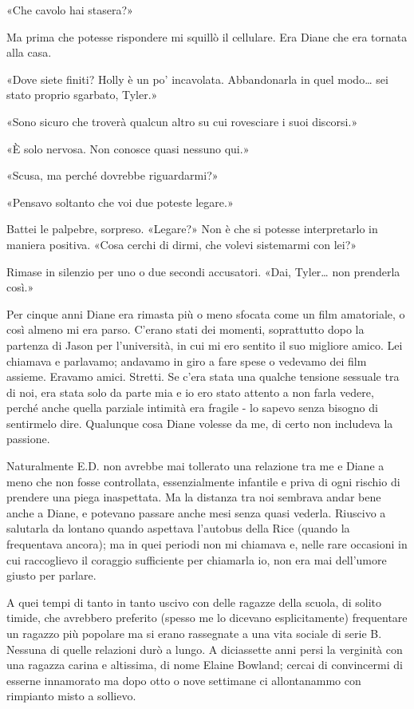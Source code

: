 «Che cavolo hai stasera?»

Ma prima che potesse rispondere mi squillò il cellulare. Era Diane che
era tornata alla casa.

«Dove siete finiti? Holly è un po' incavolata. Abbandonarla in quel
modo\ldots{} sei stato proprio sgarbato, Tyler.»

«Sono sicuro che troverà qualcun altro su cui rovesciare i suoi
discorsi.»

«È solo nervosa. Non conosce quasi nessuno qui.»

«Scusa, ma perché dovrebbe riguardarmi?»

«Pensavo soltanto che voi due poteste legare.»

Battei le palpebre, sorpreso. «Legare?» Non è che si potesse
interpretarlo in maniera positiva. «Cosa cerchi di dirmi, che volevi
sistemarmi con lei?»

Rimase in silenzio per uno o due secondi accusatori. «Dai, Tyler\ldots{}
non prenderla così.»

Per cinque anni Diane era rimasta più o meno sfocata come un film
amatoriale, o così almeno mi era parso. C'erano stati dei momenti,
soprattutto dopo la partenza di Jason per l'università, in cui mi ero
sentito il suo migliore amico. Lei chiamava e parlavamo; andavamo in
giro a fare spese o vedevamo dei film assieme. Eravamo amici. Stretti.
Se c'era stata una qualche tensione sessuale tra di noi, era stata solo
da parte mia e io ero stato attento a non farla vedere, perché anche
quella parziale intimità era fragile - lo sapevo senza bisogno di
sentirmelo dire. Qualunque cosa Diane volesse da me, di certo non
includeva la passione.

Naturalmente E.D. non avrebbe mai tollerato una relazione tra me e Diane
a meno che non fosse controllata, essenzialmente infantile e priva di
ogni rischio di prendere una piega inaspettata. Ma la distanza tra noi
sembrava andar bene anche a Diane, e potevano passare anche mesi senza
quasi vederla. Riuscivo a salutarla da lontano quando aspettava
l'autobus della Rice (quando la frequentava ancora); ma in quei periodi
non mi chiamava e, nelle rare occasioni in cui raccoglievo il coraggio
sufficiente per chiamarla io, non era mai dell'umore giusto per parlare.

A quei tempi di tanto in tanto uscivo con delle ragazze della scuola, di
solito timide, che avrebbero preferito (spesso me lo dicevano
esplicitamente) frequentare un ragazzo più popolare ma si erano
rassegnate a una vita sociale di serie B. Nessuna di quelle relazioni
durò a lungo. A diciassette anni persi la verginità con una ragazza
carina e altissima, di nome Elaine Bowland; cercai di convincermi di
esserne innamorato ma dopo otto o nove settimane ci allontanammo con
rimpianto misto a sollievo.

